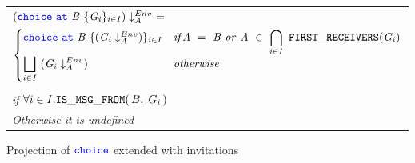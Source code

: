 \documentclass[12pt,twoside]{report}
\begin{document}









\begin{figure}[h!]
    \begin{center}
        \begin{tabular}{l}
            $(\choice\ \at\ \mathit{B}\ \{\mathit{G_i}\}_{i \in I}) \project\ =$\\[3.5pt]
            \begin{math}
               \begin{cases}
                   \choice\ \at\ \mathit{B}\ \{(\mathit{G_i} \project)\}_\varinset{i}{I} & \mathit{if} \mathit{A}\ =\ \mathit{B}\ \mathit{or}\ \mathit{A}\ \in\ \displaystyle \bigcap_\varinset{i}{I}\ \mathtt{FIRST\_RECEIVERS}(\mathit{G_i})\\
                   \displaystyle \bigsqcup_\varinset{i}{I}\ (\mathit{G_i} \project) & \mathit{otherwise}\\
               \end{cases}
           \end{math}\\\\
           
           \textit{if} $\forall {i \in I}.\mathtt{IS\_MSG\_FROM}(\,B,\; G _i\,)$\\[10pt]
           \textit{Otherwise it is undefined}
        \end{tabular}
    \end{center}
    \caption{Projection of ${\color{blue}\mathtt{choice}}$ extended with invitations}
    \label{scribble-choice-projection}
\end{figure}
\end{document}
